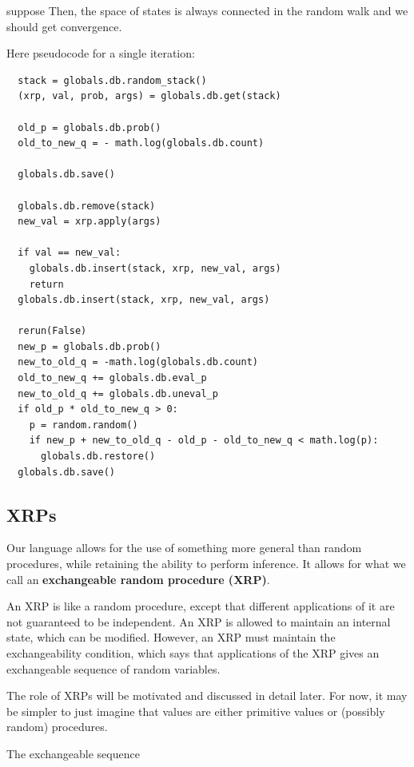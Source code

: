 \documentclass[11pt]{article}
\begin{document}
suppose 
Then, the space of states is always connected in the random walk and we should get convergence.  %

Here pseudocode for a single iteration:
\begin{small}
\begin{verbatim}
  stack = globals.db.random_stack()
  (xrp, val, prob, args) = globals.db.get(stack)

  old_p = globals.db.prob()
  old_to_new_q = - math.log(globals.db.count)

  globals.db.save()

  globals.db.remove(stack)
  new_val = xrp.apply(args)

  if val == new_val:
    globals.db.insert(stack, xrp, new_val, args)
    return
  globals.db.insert(stack, xrp, new_val, args)

  rerun(False)
  new_p = globals.db.prob() 
  new_to_old_q = -math.log(globals.db.count) 
  old_to_new_q += globals.db.eval_p 
  new_to_old_q += globals.db.uneval_p 
  if old_p * old_to_new_q > 0:
    p = random.random()
    if new_p + new_to_old_q - old_p - old_to_new_q < math.log(p):
      globals.db.restore()
  globals.db.save()
\end{verbatim}
\end{small}
\subsection{XRPs}

Our language allows for the use of something more general than random procedures, while retaining the ability to perform inference.   It allows for what we call an {\bf exchangeable random procedure (XRP)}.  

An XRP is like a random procedure, except that different applications of it are not guaranteed to be independent.  An XRP is allowed to maintain an internal state, which can be modified.  However, an XRP must maintain the exchangeability condition, which says that applications of the XRP gives an exchangeable sequence of random variables.  

The role of XRPs will be motivated and discussed in detail later.  For now, it may be simpler to just imagine that values are either primitive values or (possibly random) procedures.  

The exchangeable sequence 

\end{document}

